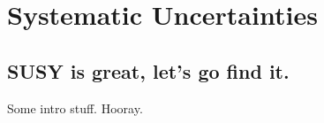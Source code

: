 \chapter{Systematic Uncertainties}

\ifpdf
    \graphicspath{{Chapter7/Figs/Raster/}{Chapter7/Figs/PDF/}{Chapter7/Figs/}}
\else
    \graphicspath{{Chapter7/Figs/Vector/}{Chapter7/Figs/}}
\fi


\section{SUSY is great, let's go find it.}  %

Some intro stuff. Hooray.